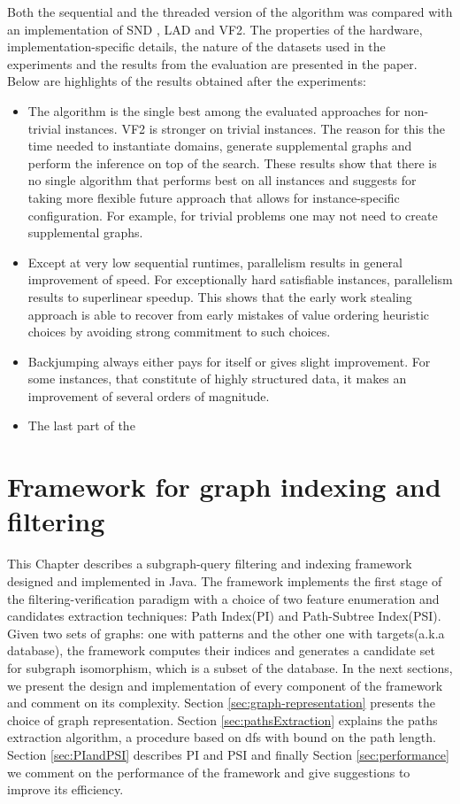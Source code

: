 \documentclass{l4proj}
\newcounter{example}[section]
\begin{document}
Both the sequential and the threaded version of the algorithm was compared with an implementation of SND \cite{SND}, LAD\cite{Solnon:2010a} and VF2\cite{vf2}. The properties of the hardware, implementation-specific details, the nature of the datasets used in the experiments and the results from the evaluation are presented in the paper\cite{CP2015}. Below are highlights of the results obtained after the experiments:
\begin{itemize}
\item The algorithm is the single best among the evaluated approaches for non-trivial instances. VF2 is stronger on trivial instances. The reason for this the time needed to instantiate domains, generate supplemental graphs and perform the inference on top of the search. These results show that there is no single algorithm that performs best on all instances and suggests for taking more flexible future approach that allows for instance-specific configuration. For example, for trivial problems one may not need to create supplemental graphs.
\item Except at very low sequential runtimes, parallelism results in general improvement of speed. For exceptionally hard satisfiable instances, parallelism results to superlinear speedup. This shows that the early work stealing approach is able to recover from early mistakes of value ordering heuristic choices by avoiding strong commitment to such choices.
\item Backjumping always either pays for itself or gives slight improvement. For some instances, that constitute of highly structured data, it makes an improvement of several orders of magnitude.
\item The last part of the 
\end{itemize}

\chapter{Framework for graph indexing and filtering}
This Chapter describes a subgraph-query filtering and indexing framework designed and implemented in Java. The framework implements the first stage of the filtering-verification paradigm with a choice of two feature enumeration and candidates extraction techniques: Path Index(PI) and Path-Subtree Index(PSI). Given two sets of graphs: one with patterns and the other one with targets(a.k.a database), the framework computes their indices and generates a candidate set for subgraph isomorphism, which is a subset of the database. In the next sections, we present the design and implementation of every component of the framework and comment on its complexity. Section \ref{sec:graph-representation} presents the choice of graph representation. Section \ref{sec:pathsExtraction} explains the paths extraction algorithm, a procedure based on \gls{dfs} with bound on the path length. Section \ref{sec:PIandPSI} describes PI and PSI and finally Section \ref{sec:performance} we comment on the performance of the framework and give suggestions to improve its efficiency.
\end{document}
